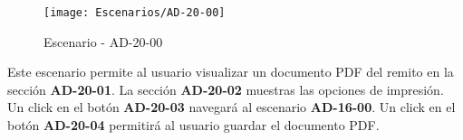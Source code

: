 \begin{figure}[H]
\centering
\texttt{[image: Escenarios/AD-20-00]}
\caption{Escenario - AD-20-00}
\label{fig:AD-20-00}
\end{figure}
Este escenario permite al usuario visualizar un documento PDF del remito en la sección \textbf{AD-20-01}. La sección \textbf{AD-20-02} muestras las opciones de impresión. Un click en el botón \textbf{AD-20-03} navegará al escenario \textbf{AD-16-00}. Un click en el botón \textbf{AD-20-04} permitirá al usuario guardar el documento PDF.
\\